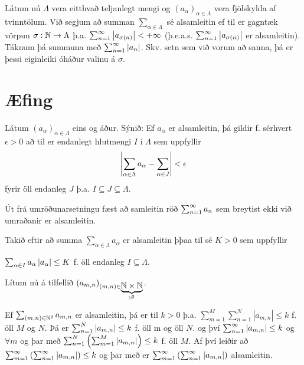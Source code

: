 \documentclass[12pt]{book}
\begin{document}
Látum nú $\Lambda$ vera eitthvað teljanlegt mengi og $(a_{\alpha})_{\alpha \in \Lambda}$ vera fjölskylda af tvinntölum. Við segjum að summan $\sum_{\alpha \in \Lambda}$ sé alsamleitin ef
til er gagntæk vörpun $\sigma: \mathbb{N} \to \Lambda$ þ.a. $\sum_{n = 1}^{\infty} \left|a_{\sigma(n)}\right| < +\infty$ (þ.e.a.s. $\sum_{n = 1}^{\infty} \left|a_{\sigma(n)}\right|$ er alsamleitin). Táknum þá summuna með $\sum_{n = 1}^{\infty} \left|a_n\right|$. Skv. setn sem við vorum að sanna, þá er þessi eiginleiki óháður valinu á $\sigma$.

\section*{Æfing}
Látum $(a_{\alpha})_{\alpha \in \Lambda}$ eins og áður. Sýnið: Ef $a_{\alpha}$ er alsamleitin, þá gildir f. sérhvert $\epsilon > 0$ að til er endanlegt hlutmengi $I$ í $\Lambda$ sem uppfyllir
\[ \left|\sum_{\alpha \in \Lambda} a_{\alpha} - \sum_{\alpha \in J} \right| < \epsilon \]
fyrir öll endanleg $J$ þ.a. $I \subseteq J \subseteq \Lambda $. 

\begin{ath} Út frá umröðunarsetningu fæst að samleitin röð $\sum_{n = 1}^{\infty} a_n$ sem breytist ekki við umraðanir er alsamleitin. 

{ 
    \def\aal{a_{\alpha}}
    \def\aall{(\aal)_{\alpha \in \Lambda}}
    \def\saal{\sum_{\alpha \in \Lambda} a_{\alpha}} 

\newcommand{\sal}[1]{\sum_{\alpha \in #1} a_{\alpha } }

Takið eftir að summa 
$\saal$ er alsamleitin þþaa til sé $ K > 0$ sem uppfyllir

$\sal{I} \abs{\aal} \leq K$ f. öll endanleg $I \subseteq \Lambda$.

\def\mn{(m,n)}
\def\amn{a_{m,n}}
Lítum nú á tilfellið $(\amn)_{\mn \in \underbrace{\N \times \N}_{\N^2}}$.

Ef $\sum_{\mn \in \N^2} \amn$ er alsamleitin, þá er til $k > 0$ þ.a.
$\sum_{m=1}^M \sum_{n=1}^N | \amn| \leq k$ f. öll $M$ og $N$.
Þá er $\sum_{n=1}^N \abs{\amn} \leq k$ f. öll m og öll $N$. og því
$\sumoinfty \abs{\amn} \leq k$ og $\forall m$ og þar með $\sum_{n=1}^N \left(\sum_{m=1}^M \abs{\amn}\right) \leq k$ f. öll $M$. Af því leiðir að $\sum_{m=1}^{\infty} \left( \sumoinfty \abs{\amn} \right) \leq k$ og þar með er $\sum_{m=1}^{\infty} \left( \sumoinfty \abs{\amn} \right)$ alsamleitin.
}


\end{ath}
\end{document}
